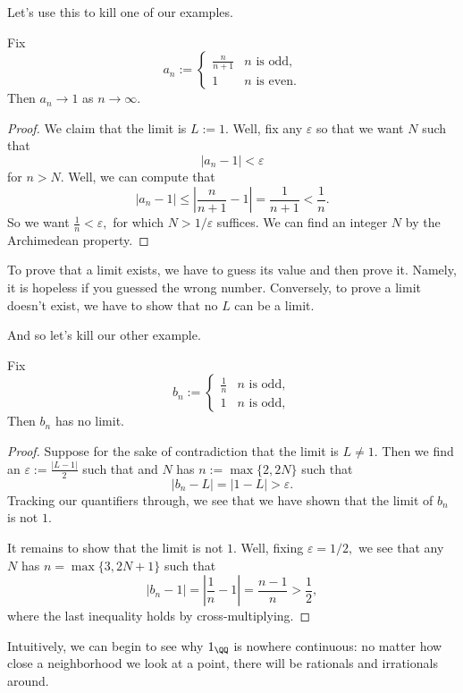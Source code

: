 Let's use this to kill one of our examples.
\begin{exercise}
    Fix
    \[a_n:=\begin{cases}
        \frac n{n+1} & n\text{ is odd}, \\
        1 & n\text{ is even}.
    \end{cases}\]
    Then $a_n\to1$ as $n\to\infty.$
\end{exercise}
\begin{proof}
    We claim that the limit is $L:=1.$ Well, fix any $\varepsilon$ so that we want $N$ such that
    \[|a_n-1|<\varepsilon\]
    for $n>N.$ Well, we can compute that
    \[|a_n-1|\le\left|\frac n{n+1}-1\right|=\frac1{n+1}<\frac1n.\]
    So we want $\frac1n<\varepsilon,$ for which $N>1/\varepsilon$ suffices. We can find an integer $N$ by the Archimedean property.
\end{proof}
\begin{remark}
    To prove that a limit exists, we have to guess its value and then prove it. Namely, it is hopeless if you guessed the wrong number. Conversely, to prove a limit doesn't exist, we have to show that no $L$ can be a limit.
\end{remark}
And so let's kill our other example.
\begin{exercise}
    Fix
    \[b_n:=\begin{cases}
        \frac1n & n\text{ is odd}, \\
        1 & n\text{ is odd},
    \end{cases}\]
    Then $b_n$ has no limit.
\end{exercise}
\begin{proof}
    Suppose for the sake of contradiction that the limit is $L\ne1.$ Then we find an $\varepsilon:=\frac{|L-1|}2$ such that and $N$ has $n:=\max\{2,2N\}$ such that
    \[|b_n-L|=|1-L|>\varepsilon.\]
    Tracking our quantifiers through, we see that we have shown that the limit of $b_n$ is not $1.$

    It remains to show that the limit is not $1.$ Well, fixing $\varepsilon=1/2,$ we see that any $N$ has $n=\max\{3,2N+1\}$ such that
    \[|b_n-1|=\left|\frac1n-1\right|=\frac{n-1}n>\frac12,\]
    where the last inequality holds by cross-multiplying.
\end{proof}
\begin{remark}
    Intuitively, we can begin to see why $1_\QQ$ is nowhere continuous: no matter how close a neighborhood we look at a point, there will be rationals and irrationals around.
\end{remark}
